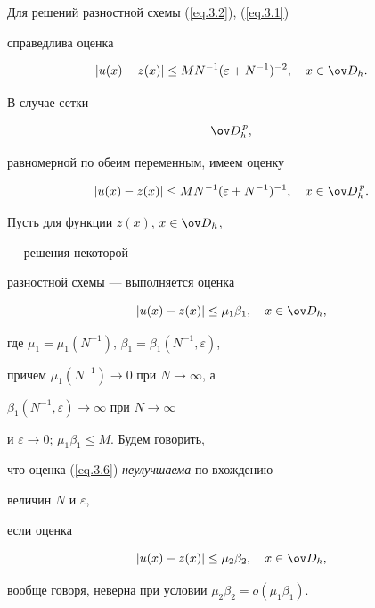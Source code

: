 Для решений разностной схемы (\ref{eq.3.2}), (\ref{eq.3.1})


справедлива оценка


\begin{equation} \label{eq.3.3}


|u(x)-z(x)|\le M N^{-1}(\varepsilon+N^{-1})^{-2},  \quad x\in \ov D_h.


\end{equation}


В случае сетки


\begin{equation} \label{eq.3.4}


\ov D_h^{\,p},


\end{equation}


равномерной по обеим переменным, имеем оценку


\begin{equation} \label{eq.3.5}


|u(x)-z(x)|\le M N^{-1}(\varepsilon+N^{-1})^{-1},\quad x\in \ov D_h^{\,p}.


\end{equation}





\begin{defns}


Пусть для функции $z(x)$, $x\in \ov D_h$,


--- решения некоторой


разностной схемы --- выполняется оценка


\begin{equation} \label{eq.3.6}


|u(x)-z(x)|\le \mu_1 \beta_1,  \quad x\in \ov D_h,


\end{equation}


где $\mu_1=\mu_1(N^{-1})$, $\beta_1=\beta_1(N^{-1},\varepsilon)$,


причем $\mu_1(N^{-1})\to 0$ при $N\to \infty$, а


$\beta_1(N^{-1},\varepsilon)\to \infty$ при $N\to\infty$


и $\varepsilon\to 0$; $\mu_1\beta_1\le M$. Будем говорить,


что оценка (\ref{eq.3.6}) {\it неулучшаема} по вхождению


величин $N$ и $\varepsilon$,


если оценка


$$


|u(x)-z(x)|\le \mu_2 \beta_2,  \quad x\in \ov D_h,


$$


вообще говоря, неверна при условии $\mu_2\beta_2=o(\mu_1\beta_1)$.


\end{defns}





